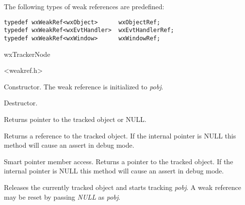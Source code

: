 
The following types of weak references are predefined: 

\begin{verbatim}
typedef wxWeakRef<wxObject>      wxObjectRef;
typedef wxWeakRef<wxEvtHandler>  wxEvtHandlerRef;
typedef wxWeakRef<wxWindow>      wxWindowRef;
\end{verbatim}



wxTrackerNode


<weakref.h>




\label{wxweakrefwxweakref}


Constructor. The weak reference is initialized to {\it pobj}.


\label{wxweakrefdtor}


Destructor.


\label{wxweakrefget}


Returns pointer to the tracked object or NULL.


\label{wxweakrefoperatorreft}


Returns a reference to the tracked object. If the internal pointer is NULL
this method will cause an assert in debug mode.


\label{wxweakrefoperatorderef}


Smart pointer member access. Returns a pointer to the
tracked object. If the internal pointer is NULL this
method will cause an assert in debug mode.


\label{wxweakrefoperatorassign}


Releases the currently tracked object and starts tracking {\it pobj}.
A weak reference may be reset by passing {\it NULL} as {\it pobj}.


